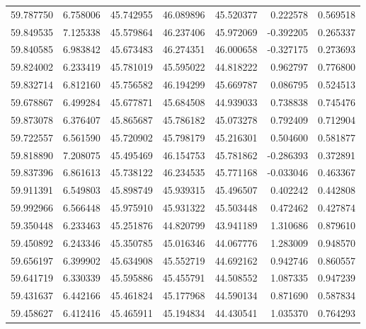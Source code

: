 \begin{tabular}{rrrrrrr}
 59.787750 &   6.758006 &         45.742955 &         46.089896 &         45.520377 &  0.222578 &  0.569518 \\
 59.849535 &   7.125338 &         45.579864 &         46.237406 &         45.972069 & -0.392205 &  0.265337 \\
 59.840585 &   6.983842 &         45.673483 &         46.274351 &         46.000658 & -0.327175 &  0.273693 \\
 59.824002 &   6.233419 &         45.781019 &         45.595022 &         44.818222 &  0.962797 &  0.776800 \\
 59.832714 &   6.812160 &         45.756582 &         46.194299 &         45.669787 &  0.086795 &  0.524513 \\
 59.678867 &   6.499284 &         45.677871 &         45.684508 &         44.939033 &  0.738838 &  0.745476 \\
 59.873078 &   6.376407 &         45.865687 &         45.786182 &         45.073278 &  0.792409 &  0.712904 \\
 59.722557 &   6.561590 &         45.720902 &         45.798179 &         45.216301 &  0.504600 &  0.581877 \\
 59.818890 &   7.208075 &         45.495469 &         46.154753 &         45.781862 & -0.286393 &  0.372891 \\
 59.837396 &   6.861613 &         45.738122 &         46.234535 &         45.771168 & -0.033046 &  0.463367 \\
 59.911391 &   6.549803 &         45.898749 &         45.939315 &         45.496507 &  0.402242 &  0.442808 \\
 59.992966 &   6.566448 &         45.975910 &         45.931322 &         45.503448 &  0.472462 &  0.427874 \\
 59.350448 &   6.233463 &         45.251876 &         44.820799 &         43.941189 &  1.310686 &  0.879610 \\
 59.450892 &   6.243346 &         45.350785 &         45.016346 &         44.067776 &  1.283009 &  0.948570 \\
 59.656197 &   6.399902 &         45.634908 &         45.552719 &         44.692162 &  0.942746 &  0.860557 \\
 59.641719 &   6.330339 &         45.595886 &         45.455791 &         44.508552 &  1.087335 &  0.947239 \\
 59.431637 &   6.442166 &         45.461824 &         45.177968 &         44.590134 &  0.871690 &  0.587834 \\
 59.458627 &   6.412416 &         45.465911 &         45.194834 &         44.430541 &  1.035370 &  0.764293 \\

\end{tabular}
